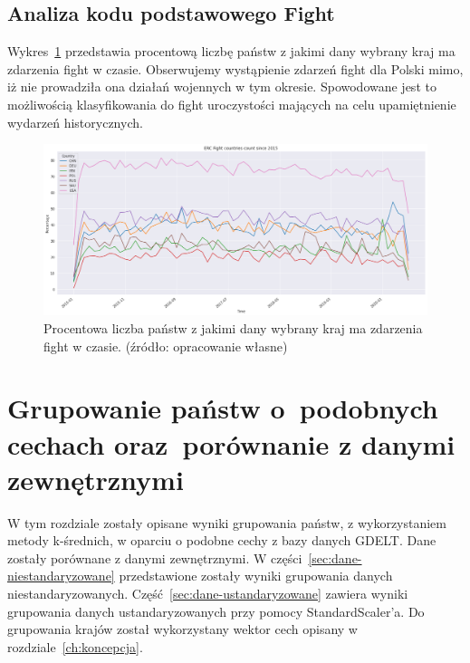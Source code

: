 \documentclass[11pt]{report}
\begin{document}
    \section{Analiza kodu podstawowego Fight}\label{sec:analiza-kodu-podstawowego-fight}

    Wykres~\ref{fig:Fight} przedstawia procentową liczbę państw z jakimi dany wybrany kraj ma zdarzenia fight w czasie.
    Obserwujemy wystąpienie zdarzeń fight dla Polski mimo, iż nie prowadziła ona działań wojennych w tym okresie.
    Spowodowane jest to możliwością klasyfikowania do fight uroczystości mających na celu upamiętnienie wydarzeń historycznych.

    \begin{figure}[!htp]
        \centering
        \includegraphics[width=\linewidth]{fig/ERC/Fight.png}
        \caption{Procentowa liczba państw z jakimi dany wybrany kraj ma zdarzenia fight w czasie. (źródło: opracowanie własne)}
        \label{fig:Fight}
    \end{figure}


    \chapter[Grupowanie państw]{Grupowanie państw o~podobnych cechach oraz~porównanie z danymi zewnętrznymi}\label{ch:grupowanie-państw-opodobnych-cechach-orazporównanie-z-danymi-zewnętrznymi}

    W tym rozdziale zostały opisane wyniki grupowania państw, z wykorzystaniem metody k-średnich, w oparciu o podobne cechy z bazy danych GDELT.
    Dane zostały porównane z danymi zewnętrznymi.
    W części~\ref{sec:dane-niestandaryzowane} przedstawione zostały wyniki grupowania danych niestandaryzowanych.
    Część~\ref{sec:dane-ustandaryzowane} zawiera wyniki grupowania danych ustandaryzowanych przy pomocy StandardScaler'a.
    Do grupowania krajów został wykorzystany wektor cech opisany w rozdziale~\ref{ch:koncepcja}.
\end{document}
